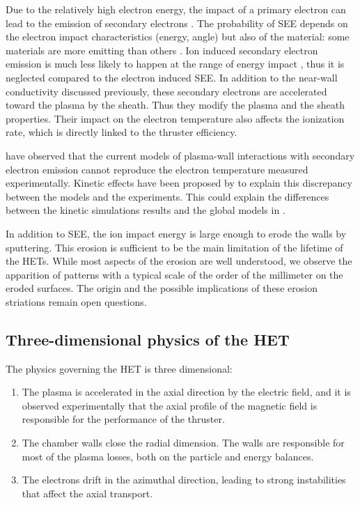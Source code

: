   Due to the relatively high electron energy, the impact of a primary electron can lead to the emission of secondary electrons \citep{barral2003a,villemant2018}.
  The probability of \ac{SEE} depends on the electron impact characteristics (energy, angle) but also of the material\string: some materials are more emitting than others \citep{gascon2003}.
  Ion induced secondary electron emission is much less likely to happen at the range of energy impact \citep{ohya2004}, thus it is neglected compared to the electron induced \ac{SEE}.
  In addition to the near-wall conductivity discussed previously, these secondary electrons are accelerated toward the plasma by the sheath.
  Thus they modify the plasma and the sheath properties.
  Their impact on the electron temperature also affects the ionization rate, which is directly linked to the thruster efficiency.
  
  
  \citet{raitses2005} have observed that the current models of plasma-wall interactions with secondary electron emission cannot reproduce the electron temperature measured experimentally.
  Kinetic effects have been proposed by \citet{sydorenko2007} to explain this discrepancy between the models and the experiments.
  This could explain the differences between the kinetic simulations results and the global models in \citet{croes2017}.   
    
  \vspace{1em}
  In addition to \ac{SEE}, the ion impact energy is large enough to erode the walls by sputtering.
  This erosion is sufficient to be the main limitation of the lifetime of the \ac{HET}s.
  While most aspects of the erosion are well understood, we observe the apparition of  patterns with a typical scale of the order of the millimeter on the eroded surfaces.
  The origin and the possible implications of these erosion striations remain open questions.
  

\subsection{Three-dimensional physics of the HET}
\label{sec-3Dphi}

The physics governing the \ac{HET} is three dimensional\string:
\begin{enumerate}
  \item The plasma is accelerated in the axial direction by the electric field, and it is observed experimentally that the axial profile of the magnetic field is responsible for the performance of the thruster.
  \item The chamber walls close the radial dimension. The walls are responsible for most of the plasma losses, both on the particle and energy balances.
  \item The electrons drift in the azimuthal direction, leading to strong instabilities that affect the axial transport.
\end{enumerate}

